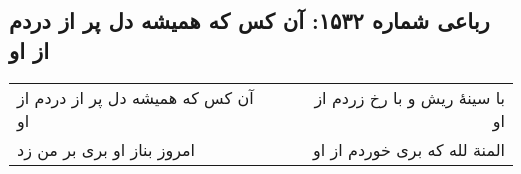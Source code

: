 \begin{center}
\section*{رباعی شماره ۱۵۳۲: آن کس که همیشه دل پر از دردم از او}
\label{sec:1532}
\begin{longtable}{l p{0.5cm} r}
آن کس که همیشه دل پر از دردم از او
&&
با سینهٔ ریش و با رخ زردم از او
\\
امروز بناز او بری بر من زد
&&
المنة لله که بری خوردم از او
\\
\end{longtable}
\end{center}
